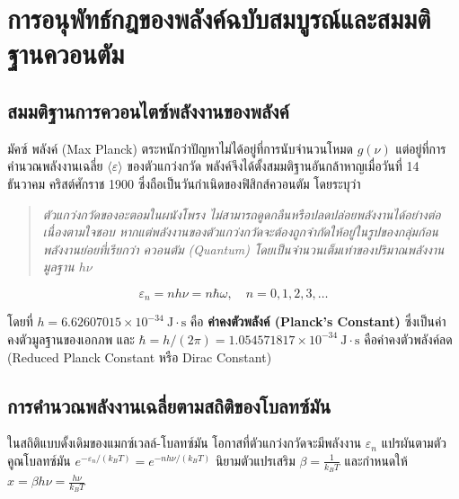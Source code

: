 \section{การอนุพัทธ์กฎของพลังค์ฉบับสมบูรณ์และสมมติฐานควอนตัม}

\subsection{สมมติฐานการควอนไตซ์พลังงานของพลังค์}

มัคซ์ พลังค์ (Max Planck) ตระหนักว่าปัญหาไม่ได้อยู่ที่การนับจำนวนโหมด $g(\nu)$ แต่อยู่ที่การคำนวณพลังงานเฉลี่ย $\langle \varepsilon \rangle$ ของตัวแกว่งกวัด พลังค์จึงได้ตั้งสมมติฐานอันกล้าหาญเมื่อวันที่ 14 ธันวาคม คริสต์ศักราช 1900 ซึ่งถือเป็นวันกำเนิดของฟิสิกส์ควอนตัม โดยระบุว่า

\begin{quote}
\textit{ตัวแกว่งกวัดของอะตอมในผนังโพรง ไม่สามารถดูดกลืนหรือปลดปล่อยพลังงานได้อย่างต่อเนื่องตามใจชอบ หากแต่พลังงานของตัวแกว่งกวัดจะต้องถูกจำกัดให้อยู่ในรูปของกลุ่มก้อนพลังงานย่อยที่เรียกว่า ควอนตัม (Quantum) โดยเป็นจำนวนเต็มเท่าของปริมาณพลังงานมูลฐาน $h\nu$}
\end{quote}

\begin{equation}
\varepsilon_n = n h\nu = n \hbar \omega, \quad n = 0, 1, 2, 3, \dots
\label{eq:planck_energy_levels}
\end{equation}

โดยที่ $h = 6.62607015 \times 10^{-34}~\text{J}\cdot\text{s}$ คือ \textbf{ค่าคงตัวพลังค์ (Planck's Constant)} ซึ่งเป็นค่าคงตัวมูลฐานของเอกภพ และ $\hbar = h/(2\pi) = 1.054571817 \times 10^{-34}~\text{J}\cdot\text{s}$ คือค่าคงตัวพลังค์ลด (Reduced Planck Constant หรือ Dirac Constant)

\subsection{การคำนวณพลังงานเฉลี่ยตามสถิติของโบลทซ์มัน}

ในสถิติแบบดั้งเดิมของแมกซ์เวลล์-โบลทซ์มัน โอกาสที่ตัวแกว่งกวัดจะมีพลังงาน $\varepsilon_n$ แปรผันตามตัวคูณโบลทซ์มัน $e^{-\varepsilon_n / (k_B T)} = e^{-n h\nu / (k_B T)}$ นิยามตัวแปรเสริม $\beta = \frac{1}{k_B T}$ และกำหนดให้ $x = \beta h\nu = \frac{h\nu}{k_B T}$

